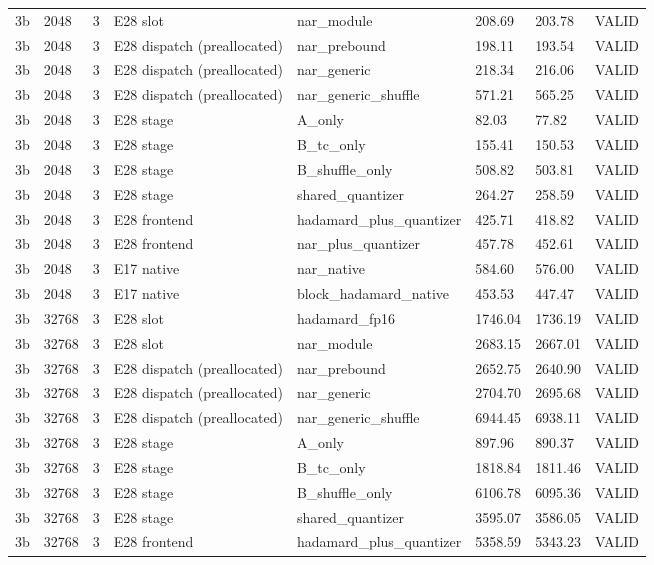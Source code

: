 {\begin{longtable}{llllllll}
3b & 2048 & 3 & E28 slot & nar\_module & 208.69 & 203.78 & VALID \\
3b & 2048 & 3 & E28 dispatch (preallocated) & nar\_prebound & 198.11 & 193.54 & VALID \\
3b & 2048 & 3 & E28 dispatch (preallocated) & nar\_generic & 218.34 & 216.06 & VALID \\
3b & 2048 & 3 & E28 dispatch (preallocated) & nar\_generic\_shuffle & 571.21 & 565.25 & VALID \\
3b & 2048 & 3 & E28 stage & A\_only & 82.03 & 77.82 & VALID \\
3b & 2048 & 3 & E28 stage & B\_tc\_only & 155.41 & 150.53 & VALID \\
3b & 2048 & 3 & E28 stage & B\_shuffle\_only & 508.82 & 503.81 & VALID \\
3b & 2048 & 3 & E28 stage & shared\_quantizer & 264.27 & 258.59 & VALID \\
3b & 2048 & 3 & E28 frontend & hadamard\_plus\_quantizer & 425.71 & 418.82 & VALID \\
3b & 2048 & 3 & E28 frontend & nar\_plus\_quantizer & 457.78 & 452.61 & VALID \\
3b & 2048 & 3 & E17 native & nar\_native & 584.60 & 576.00 & VALID \\
3b & 2048 & 3 & E17 native & block\_hadamard\_native & 453.53 & 447.47 & VALID \\
3b & 32768 & 3 & E28 slot & hadamard\_fp16 & 1746.04 & 1736.19 & VALID \\
3b & 32768 & 3 & E28 slot & nar\_module & 2683.15 & 2667.01 & VALID \\
3b & 32768 & 3 & E28 dispatch (preallocated) & nar\_prebound & 2652.75 & 2640.90 & VALID \\
3b & 32768 & 3 & E28 dispatch (preallocated) & nar\_generic & 2704.70 & 2695.68 & VALID \\
3b & 32768 & 3 & E28 dispatch (preallocated) & nar\_generic\_shuffle & 6944.45 & 6938.11 & VALID \\
3b & 32768 & 3 & E28 stage & A\_only & 897.96 & 890.37 & VALID \\
3b & 32768 & 3 & E28 stage & B\_tc\_only & 1818.84 & 1811.46 & VALID \\
3b & 32768 & 3 & E28 stage & B\_shuffle\_only & 6106.78 & 6095.36 & VALID \\
3b & 32768 & 3 & E28 stage & shared\_quantizer & 3595.07 & 3586.05 & VALID \\
3b & 32768 & 3 & E28 frontend & hadamard\_plus\_quantizer & 5358.59 & 5343.23 & VALID \\

\end{longtable}}
